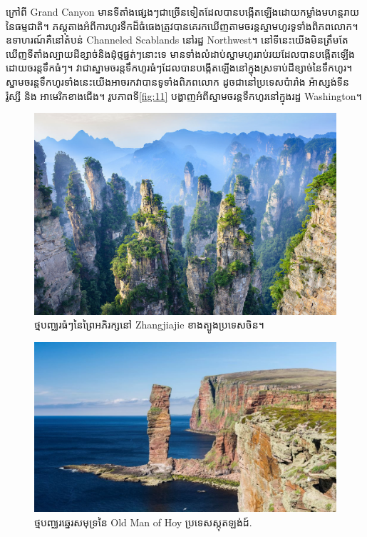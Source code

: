 \documentclass[10pt,twocolumn,letterpaper]{article}
\begin{document}
ក្រៅពី Grand Canyon មានទីតាំងផ្សេងៗជាច្រើនទៀតដែលបានបង្កើតឡើងដោយកម្លាំងមហន្តរាយនៃធម្មជាតិ។ ភស្តុតាងអំពីការហូរទឹកដ៏ធំធេងត្រូវបានគេរកឃើញតាមចរន្តស្នាមហូរទូទាំងពិភពលោក។ ឧទាហរណ៍គឺនៅតំបន់ Channeled Scablands នៅរដ្ឋ Northwest។ នៅទីនេះយើងមិនត្រឹមតែឃើញទីតាំងល្បាយដីខ្សាច់និងដុំថ្មផ្នត់ៗនោះទេ មានទាំងលំដាប់ស្នាមហូររាប់រយដែលបានបង្កើតឡើងដោយចរន្តទឹកធំៗ\cite{78,79}។ វាជាស្នាមចរន្តទឹកហូរធំៗដែលបានបង្កើតឡើងនៅក្នុងស្រទាប់ដីខ្សាច់នៃទឹកហូរ។ ស្នាមចរន្តទឹកហូរទាំងនេះយើងអាចរកវាបានទូទាំងពិភពលោក ដូចជានៅប្រទេសប៉ារាំង អ៉ាស្សង់ទីន រ៉ូស្សី និង អាមេរិកខាងជើង\cite{81}។ រូបភាពទី\ref{fig:11} បង្ហាញអំពីស្នាមចរន្តទឹកហូរនៅក្នុងរដ្ឋ Washington\cite{80}។

\begin{figure}[b]
\begin{center}
   \includegraphics[width=1\linewidth]{zhangjiajie.jpg}
\end{center}
   \caption{ថ្មបញ្ឈរធំៗនៃព្រៃអភិរក្សនៅ Zhangjiajie ខាងត្បូងប្រទេសចិន។}
\label{fig:12}
\label{fig:onecol}
\end{figure}

\begin{figure}[b]
\begin{center}

   \includegraphics[width=1\linewidth]{hoy.jpg}
\end{center}
   \caption{ថ្មបញ្ឈរឆ្នេរសមុទ្រនៃ Old Man of Hoy ប្រទេសស្កុតឡង់ដ៍\cite{83}.}
\label{fig:13}
\label{fig:onecol}
\end{figure}
\end{document}
